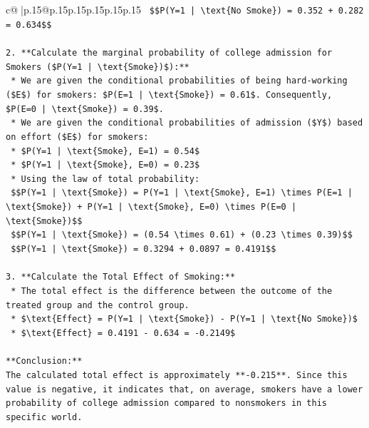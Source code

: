 \documentclass{article}
\begin{document}
{\begin{supertabular}{c@{$\;$}|p{.15\linewidth}@{}p{.15\linewidth}p{.15\linewidth}p{.15\linewidth}p{.15\linewidth}p{.15\linewidth}}
{{{\texttt{        \$\$P(Y=1 | \textbackslash{}text\{No Smoke\}) = 0.352 + 0.282 = 0.634\$\$} \\
\\ 
\texttt{2.  **Calculate the marginal probability of college admission for Smokers (\$P(Y=1 | \textbackslash{}text\{Smoke\})\$):**} \\
\texttt{    *   We are given the conditional probabilities of being hard{-}working (\$E\$) for smokers: \$P(E=1 | \textbackslash{}text\{Smoke\}) = 0.61\$. Consequently, \$P(E=0 | \textbackslash{}text\{Smoke\}) = 0.39\$.} \\
\texttt{    *   We are given the conditional probabilities of admission (\$Y\$) based on effort (\$E\$) for smokers:} \\
\texttt{        *   \$P(Y=1 | \textbackslash{}text\{Smoke\}, E=1) = 0.54\$} \\
\texttt{        *   \$P(Y=1 | \textbackslash{}text\{Smoke\}, E=0) = 0.23\$} \\
\texttt{    *   Using the law of total probability:} \\
\texttt{        \$\$P(Y=1 | \textbackslash{}text\{Smoke\}) = P(Y=1 | \textbackslash{}text\{Smoke\}, E=1) \textbackslash{}times P(E=1 | \textbackslash{}text\{Smoke\}) + P(Y=1 | \textbackslash{}text\{Smoke\}, E=0) \textbackslash{}times P(E=0 | \textbackslash{}text\{Smoke\})\$\$} \\
\texttt{        \$\$P(Y=1 | \textbackslash{}text\{Smoke\}) = (0.54 \textbackslash{}times 0.61) + (0.23 \textbackslash{}times 0.39)\$\$} \\
\texttt{        \$\$P(Y=1 | \textbackslash{}text\{Smoke\}) = 0.3294 + 0.0897 = 0.4191\$\$} \\
\\ 
\texttt{3.  **Calculate the Total Effect of Smoking:**} \\
\texttt{    *   The total effect is the difference between the outcome of the treated group and the control group.} \\
\texttt{    *   \$\textbackslash{}text\{Effect\} = P(Y=1 | \textbackslash{}text\{Smoke\}) {-} P(Y=1 | \textbackslash{}text\{No Smoke\})\$} \\
\texttt{    *   \$\textbackslash{}text\{Effect\} = 0.4191 {-} 0.634 = {-}0.2149\$} \\
\\ 
\texttt{**Conclusion:**} \\
\texttt{The calculated total effect is approximately **{-}0.215**. Since this value is negative, it indicates that, on average, smokers have a lower probability of college admission compared to nonsmokers in this specific world.} \\
}}}
\end{supertabular}}
\end{document}

